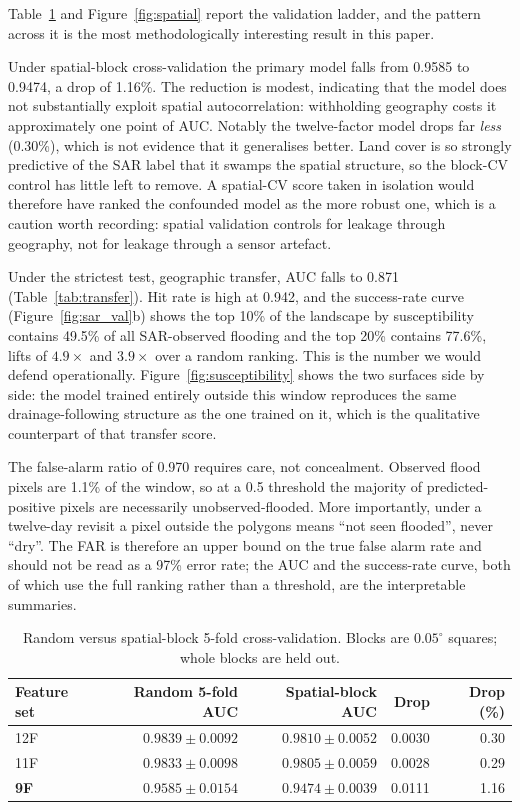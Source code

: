 \documentclass[journal]{IEEEtran}
\begin{document}
Table~\ref{tab:spatial} and Figure~\ref{fig:spatial} report the validation
ladder, and the pattern across it is the most methodologically interesting result
in this paper.

Under spatial-block cross-validation the primary model falls from 0.9585 to
0.9474, a drop of 1.16\%. The reduction is modest, indicating that the model
does not substantially exploit spatial autocorrelation: withholding geography
costs it approximately one point of AUC. Notably the twelve-factor model drops far \emph{less}
(0.30\%), which is not evidence that it generalises better. Land cover is so
strongly predictive of the SAR label that it swamps the spatial structure, so the
block-CV control has little left to remove. A spatial-CV score taken in isolation
would therefore have ranked the confounded model as the more robust one, which is
a caution worth recording: spatial validation controls for leakage through
geography, not for leakage through a sensor artefact.

Under the strictest test, geographic transfer, AUC falls to 0.871
(Table~\ref{tab:transfer}). Hit rate is high at 0.942, and the success-rate curve
(Figure~\ref{fig:sar_val}b) shows the top 10\% of the landscape by susceptibility
contains 49.5\% of all SAR-observed flooding and the top 20\% contains 77.6\%,
lifts of $4.9\times$ and $3.9\times$ over a random ranking. This is the number we
would defend operationally. Figure~\ref{fig:susceptibility} shows the two
surfaces side by side: the model trained entirely outside this window
reproduces the same drainage-following structure as the one trained on it,
which is the qualitative counterpart of that transfer score.

The false-alarm ratio of 0.970 requires care, not concealment. Observed
flood pixels are 1.1\% of the window, so at a 0.5 threshold the majority of
predicted-positive pixels are necessarily unobserved-flooded. More importantly,
under a twelve-day revisit a pixel outside the polygons means ``not seen
flooded'', never ``dry''. The FAR is therefore an upper bound on the true false
alarm rate and should not be read as a 97\% error rate; the AUC and the
success-rate curve, both of which use the full ranking rather than a threshold,
are the interpretable summaries.

\begin{table}[!t]
\centering\footnotesize
\caption{Random versus spatial-block 5-fold cross-validation. Blocks are
$0.05^\circ$ squares; whole blocks are held out.}
\label{tab:spatial}
\small
\begin{tabular}{@{}lrrrr@{}}
\toprule
\textbf{Feature set} & \textbf{Random 5-fold AUC} & \textbf{Spatial-block AUC} &
\textbf{Drop} & \textbf{Drop (\%)} \\
\midrule
12F & $0.9839\pm0.0092$ & $0.9810\pm0.0052$ & 0.0030 & 0.30 \\
11F & $0.9833\pm0.0098$ & $0.9805\pm0.0059$ & 0.0028 & 0.29 \\
\textbf{9F} & $0.9585\pm0.0154$ & $0.9474\pm0.0039$ & 0.0111 & 1.16 \\
\bottomrule
\end{tabular}
\end{table}
\end{document}
